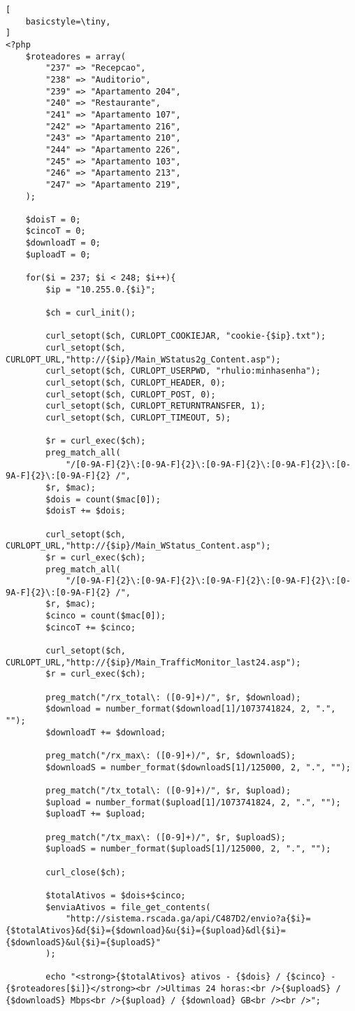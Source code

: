 \label{ap:apendice-roteadores}

\begin{lstlisting}[
    basicstyle=\tiny,
]
<?php
    $roteadores = array(
		"237" => "Recepcao",
		"238" => "Auditorio",
		"239" => "Apartamento 204",
		"240" => "Restaurante",
		"241" => "Apartamento 107",
		"242" => "Apartamento 216",
		"243" => "Apartamento 210",
		"244" => "Apartamento 226",
		"245" => "Apartamento 103",
		"246" => "Apartamento 213",
		"247" => "Apartamento 219",
	);

	$doisT = 0;
	$cincoT = 0;
	$downloadT = 0;
	$uploadT = 0;

	for($i = 237; $i < 248; $i++){
		$ip = "10.255.0.{$i}";

		$ch = curl_init();

		curl_setopt($ch, CURLOPT_COOKIEJAR, "cookie-{$ip}.txt");
		curl_setopt($ch, CURLOPT_URL,"http://{$ip}/Main_WStatus2g_Content.asp");
		curl_setopt($ch, CURLOPT_USERPWD, "rhulio:minhasenha");
		curl_setopt($ch, CURLOPT_HEADER, 0);
		curl_setopt($ch, CURLOPT_POST, 0);
		curl_setopt($ch, CURLOPT_RETURNTRANSFER, 1);
		curl_setopt($ch, CURLOPT_TIMEOUT, 5);

		$r = curl_exec($ch);
		preg_match_all(
		    "/[0-9A-F]{2}\:[0-9A-F]{2}\:[0-9A-F]{2}\:[0-9A-F]{2}\:[0-9A-F]{2}\:[0-9A-F]{2} /",
		$r, $mac);
		$dois = count($mac[0]);
		$doisT += $dois;

		curl_setopt($ch, CURLOPT_URL,"http://{$ip}/Main_WStatus_Content.asp");
		$r = curl_exec($ch);
		preg_match_all(
		    "/[0-9A-F]{2}\:[0-9A-F]{2}\:[0-9A-F]{2}\:[0-9A-F]{2}\:[0-9A-F]{2}\:[0-9A-F]{2} /",
		$r, $mac);
		$cinco = count($mac[0]);
		$cincoT += $cinco;

		curl_setopt($ch, CURLOPT_URL,"http://{$ip}/Main_TrafficMonitor_last24.asp");
		$r = curl_exec($ch);

		preg_match("/rx_total\: ([0-9]+)/", $r, $download);
		$download = number_format($download[1]/1073741824, 2, ".", "");
		$downloadT += $download;

		preg_match("/rx_max\: ([0-9]+)/", $r, $downloadS);
		$downloadS = number_format($downloadS[1]/125000, 2, ".", "");

		preg_match("/tx_total\: ([0-9]+)/", $r, $upload);
		$upload = number_format($upload[1]/1073741824, 2, ".", "");
		$uploadT += $upload;
		
		preg_match("/tx_max\: ([0-9]+)/", $r, $uploadS);
		$uploadS = number_format($uploadS[1]/125000, 2, ".", "");

		curl_close($ch);

		$totalAtivos = $dois+$cinco;
		$enviaAtivos = file_get_contents(
		    "http://sistema.rscada.ga/api/C487D2/envio?a{$i}={$totalAtivos}&d{$i}={$download}&u{$i}={$upload}&dl{$i}={$downloadS}&ul{$i}={$uploadS}"
		);

		echo "<strong>{$totalAtivos} ativos - {$dois} / {$cinco} - {$roteadores[$i]}</strong><br />Ultimas 24 horas:<br />{$uploadS} / {$downloadS} Mbps<br />{$upload} / {$download} GB<br /><br />";
\end{lstlisting}